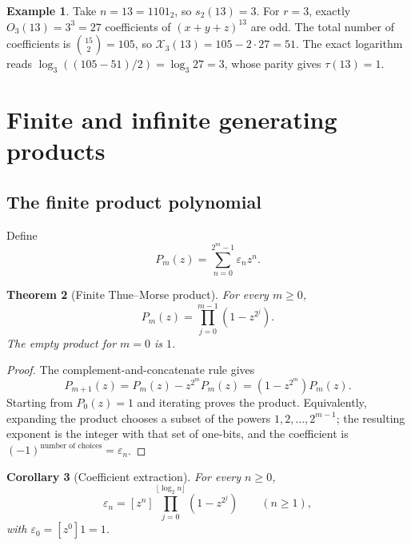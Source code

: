 \documentclass[11pt,oneside]{article}
\newtheorem{theorem}{Theorem}[section]
\newtheorem{corollary}[theorem]{Corollary}
\theoremstyle{definition}
\newtheorem{example}[theorem]{Example}
\theoremstyle{remark}
\newcommand{\swt}{s_2}
\newcommand{\eps}{\varepsilon}
\newcommand{\1}{\mathbf 1}
\begin{document}
\begin{example}
Take \(n=13=1101_2\), so \(\swt(13)=3\).  For \(r=3\), exactly
\(O_3(13)=3^3=27\) coefficients of \((x+y+z)^{13}\) are odd.  The total number of
coefficients is \(\binom{15}{2}=105\), so
\(\mathcal X_3(13)=105-2\cdot27=51\).  The exact logarithm reads
\(\log_3((105-51)/2)=\log_3 27=3\), whose parity gives \(\tau(13)=1\).
\end{example}

\section{Finite and infinite generating products}
\label{p3:sec:products}

\subsection{The finite product polynomial}

Define
\begin{equation}
 P_m(z)=\sum_{n=0}^{2^m-1}\eps_nz^n.
 \label{p3:eq:Pm-def}
\end{equation}

\begin{theorem}[Finite Thue--Morse product]
\label{p3:thm:finite-product}
For every \(m\ge0\),
\begin{equation}
 \boxed{
 P_m(z)=\prod_{j=0}^{m-1}(1-z^{2^j}).}
 \label{p3:eq:finite-product}
\end{equation}
The empty product for \(m=0\) is \(1\).
\end{theorem}

\begin{proof}
The complement-and-concatenate rule gives
\[
 P_{m+1}(z)
 =P_m(z)-z^{2^m}P_m(z)
 =(1-z^{2^m})P_m(z).
\]
Starting from \(P_0(z)=1\) and iterating proves the product.  Equivalently, expanding the
product chooses a subset of the powers \(1,2,\ldots,2^{m-1}\); the resulting exponent is the
integer with that set of one-bits, and the coefficient is \((-1)^{\text{number of choices}}
=\eps_n\).
\end{proof}

\begin{corollary}[Coefficient extraction]
\label{p3:cor:coefficient}
For every \(n\ge0\),
\begin{equation}
 \boxed{
 \eps_n=[z^n]\prod_{j=0}^{\lfloor\log_2n\rfloor}(1-z^{2^j})}
 \qquad(n\ge1),
 \label{p3:eq:coefficient-formula}
\end{equation}
with \(\eps_0=[z^0]1=1\).
\end{corollary}
\end{document}
